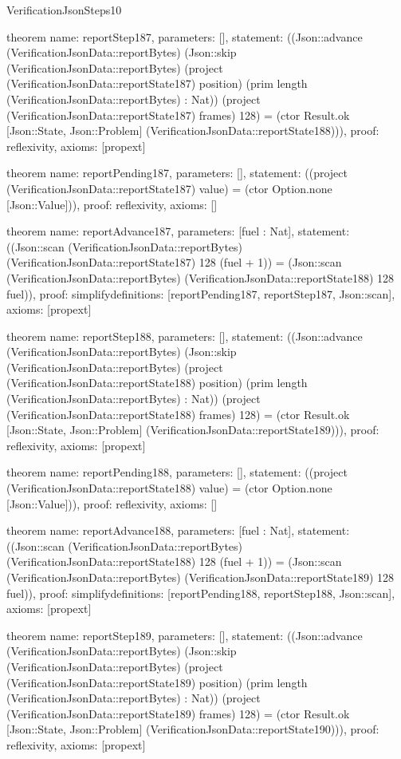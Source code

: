 \begin{lexlean}{VerificationJsonSteps10}
\begin{semanticmodule}
theorem{
  name: reportStep187,
  parameters: [],
  statement: ((Json::advance (VerificationJsonData::reportBytes) (Json::skip (VerificationJsonData::reportBytes) (project (VerificationJsonData::reportState187) position) (prim length (VerificationJsonData::reportBytes) : Nat)) (project (VerificationJsonData::reportState187) frames) 128) = (ctor Result.ok [Json::State, Json::Problem] (VerificationJsonData::reportState188))),
  proof: reflexivity{},
  axioms: [propext]
}

theorem{
  name: reportPending187,
  parameters: [],
  statement: ((project (VerificationJsonData::reportState187) value) = (ctor Option.none [Json::Value])),
  proof: reflexivity{},
  axioms: []
}

theorem{
  name: reportAdvance187,
  parameters: [fuel : Nat],
  statement: ((Json::scan (VerificationJsonData::reportBytes) (VerificationJsonData::reportState187) 128 (fuel + 1)) = (Json::scan (VerificationJsonData::reportBytes) (VerificationJsonData::reportState188) 128 fuel)),
  proof: simplify{definitions: [reportPending187, reportStep187, Json::scan]},
  axioms: [propext]
}

theorem{
  name: reportStep188,
  parameters: [],
  statement: ((Json::advance (VerificationJsonData::reportBytes) (Json::skip (VerificationJsonData::reportBytes) (project (VerificationJsonData::reportState188) position) (prim length (VerificationJsonData::reportBytes) : Nat)) (project (VerificationJsonData::reportState188) frames) 128) = (ctor Result.ok [Json::State, Json::Problem] (VerificationJsonData::reportState189))),
  proof: reflexivity{},
  axioms: [propext]
}

theorem{
  name: reportPending188,
  parameters: [],
  statement: ((project (VerificationJsonData::reportState188) value) = (ctor Option.none [Json::Value])),
  proof: reflexivity{},
  axioms: []
}

theorem{
  name: reportAdvance188,
  parameters: [fuel : Nat],
  statement: ((Json::scan (VerificationJsonData::reportBytes) (VerificationJsonData::reportState188) 128 (fuel + 1)) = (Json::scan (VerificationJsonData::reportBytes) (VerificationJsonData::reportState189) 128 fuel)),
  proof: simplify{definitions: [reportPending188, reportStep188, Json::scan]},
  axioms: [propext]
}

theorem{
  name: reportStep189,
  parameters: [],
  statement: ((Json::advance (VerificationJsonData::reportBytes) (Json::skip (VerificationJsonData::reportBytes) (project (VerificationJsonData::reportState189) position) (prim length (VerificationJsonData::reportBytes) : Nat)) (project (VerificationJsonData::reportState189) frames) 128) = (ctor Result.ok [Json::State, Json::Problem] (VerificationJsonData::reportState190))),
  proof: reflexivity{},
  axioms: [propext]
}


\end{semanticmodule}
\end{lexlean}
